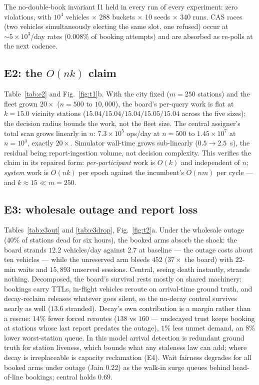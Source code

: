 \documentclass[twoside,twocolumn,usenatbib]{mnras}
\begin{document}


The no-double-book invariant I1 held in every run of every
experiment: zero violations, with $10^4$ vehicles $\times$ $288$
buckets $\times$ 10 seeds $\times$ 340 runs.  CAS races (two
vehicles simultaneously electing the same slot, one refused) occur
at $\sim\!5{\times}10^3$/day rates ($0.008\%$ of booking attempts)
and are absorbed as re-polls at the next cadence.

\subsection{E2: the $O(nk)$ claim}

Table~\ref{tab:e2} and Fig.~\ref{fig:t1}b.  With the city fixed
($m=250$ stations) and the fleet grown $20\times$ ($n=500$ to
$10{,}000$), the board's per-query work is flat at $k=15.0$ vicinity
stations ($15.04/15.04/15.04/15.05/15.04$ across the five sizes);
the decision radius bounds the work, not the fleet size.  The
central
assigner's total scan grows linearly in $n$: $7.3\times10^5$ ops/day
at $n=500$ to $1.45\times10^7$ at $n=10^4$, exactly $20\times$.
Simulator wall-time grows sub-linearly ($0.5\to2.5$~s), the
residual being report-ingestion volume, not decision complexity.
This verifies the claim in its repaired form: \emph{per-participant}
work is $O(k)$ and independent of $n$; \emph{system} work is
$O(nk)$ per epoch against the incumbent's $O(nm)$ per cycle --- and
$k\approx15 \ll m=250$.



\subsection{E3: wholesale outage and report loss}

Tables~\ref{tab:e3out} and \ref{tab:e3drop}, Fig.~\ref{fig:t2}a.
Under the wholesale outage (40\% of stations dead for six hours), the
booked arms absorb the shock: the board strands $12.2$ vehicles/day
against $2.7$ at baseline --- the outage costs about ten vehicles ---
while the unreserved arm bleeds $452$ ($37\times$ the board) with
$22$-min waits and $15{,}893$ unserved sessions.  Central, seeing
death instantly, strands nothing.  Decomposed, the board's survival
rests mostly on shared machinery:
bookings carry TTLs, in-flight vehicles reroute on arrival-time ground
truth, and decay-reclaim releases whatever goes silent, so the
no-decay control survives nearly as well ($13.6$ stranded).  Decay's
own contribution is a margin rather than a rescue: $14\%$ fewer forced
reroutes ($138$ vs $160$ --- undecayed trust keeps booking at
stations whose last report predates the outage), $1\%$ less unmet
demand, an $8\%$ lower worst-station queue.  In this model arrival
detection is redundant ground truth for station liveness, which bounds
what any staleness law can add; where decay is irreplaceable is
capacity reclamation (E4).  Wait fairness degrades for all booked arms
under outage (Jain $0.22$) as the walk-in surge queues behind
head-of-line bookings; central holds $0.69$.
\end{document}
